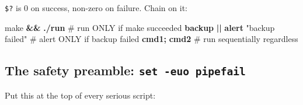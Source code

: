 \documentclass[11pt]{article}
\newenvironment{Shaded}{\begin{snugshade}}{\end{snugshade}}
\newcommand{\BuiltInTok}[1]{\textcolor[rgb]{0.50,0.55,0.55}{#1}}
\newcommand{\CommentTok}[1]{\textcolor[rgb]{0.48,0.49,0.49}{#1}}
\newcommand{\ControlFlowTok}[1]{\textcolor[rgb]{0.99,0.74,0.29}{\textbf{#1}}}
\newcommand{\DecValTok}[1]{\textcolor[rgb]{0.96,0.45,0.00}{#1}}
\newcommand{\ExtensionTok}[1]{\textcolor[rgb]{0.00,0.60,1.00}{\textbf{#1}}}
\newcommand{\FunctionTok}[1]{\textcolor[rgb]{0.56,0.27,0.68}{#1}}
\newcommand{\KeywordTok}[1]{\textcolor[rgb]{0.81,0.81,0.76}{\textbf{#1}}}
\newcommand{\NormalTok}[1]{\textcolor[rgb]{0.81,0.81,0.76}{#1}}
\newcommand{\OperatorTok}[1]{\textcolor[rgb]{0.81,0.81,0.76}{#1}}
\newcommand{\StringTok}[1]{\textcolor[rgb]{0.96,0.31,0.31}{#1}}
\newcommand{\VariableTok}[1]{\textcolor[rgb]{0.15,0.68,0.68}{#1}}
\begin{document}
\begin{Shaded}
\end{Shaded}

\texttt{\$?} is 0 on success, non-zero on failure. Chain on it:


\begin{Shaded}
\begin{Highlighting}[]
\FunctionTok{make} \KeywordTok{\&\&} \ExtensionTok{./run}                 \CommentTok{\# run ONLY if make succeeded}
\ExtensionTok{backup} \KeywordTok{||} \ExtensionTok{alert} \StringTok{"backup failed"}   \CommentTok{\# alert ONLY if backup failed}
\ExtensionTok{cmd1}\KeywordTok{;} \ExtensionTok{cmd2}                    \CommentTok{\# run sequentially regardless}
\end{Highlighting}
\end{Shaded}

\subsection{\texorpdfstring{The safety preamble: \texttt{set\ -euo\ pipefail}}{The safety preamble: set -euo pipefail}}\label{the-safety-preamble-set--euo-pipefail}

Put this at the top of every serious script:

\end{document}
